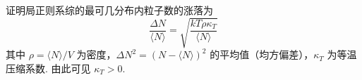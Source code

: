 \documentclass{assignment}
\begin{document}
\begin{prob}
    证明局正则系综的最可几分布内粒子数的涨落为
    \[
        \frac{\Delta N}{\langle N\rangle}=\sqrt{\frac{kT\rho\kappa_T}{\langle N\rangle}}
    \]
    其中 $\rho=\langle N\rangle/V$ 为密度，$\Delta N^2=(N-\langle N\rangle)^2$ 的平均值（均方偏差），$\kappa_T$ 为等温压缩系数. 由此可见 $\kappa_T>0$.
\end{prob}
\begin{pf}
    
\end{pf}
\end{document}
